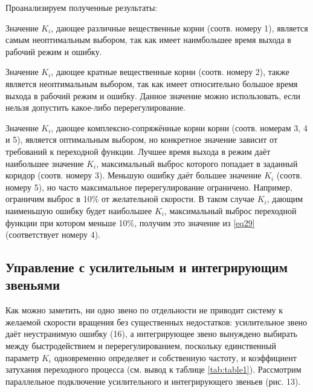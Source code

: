 \documentclass[12pt,a4paper]{extarticle}
\begin{document}
	Проанализируем полученные результаты:
	
	Значение $K_i$, дающее различные вещественные корни (соотв. номеру 1), является самым неоптимальным выбором, так как имеет наимбольшее время выхода в рабочий режим и ошибку.
	
	Значение $K_i$, дающее кратные вещественные корни (соотв. номеру 2), также является неоптимальным выбором, так как имеет относительно большое время выхода в рабочий режим и ошибку. Данное значение можно использовать, если нельзя допустить какое-либо перерегулирование.
	
	Значение $K_i$, дающее комплексно-сопряжённые корни корни (соотв. номерам 3, 4 и 5), является оптимальным выбором, но конкретное значение зависит от требований к переходной функции. Лучшее время выхода в режим даёт наибольшее значение $K_i$, максимальный выброс которого попадает в заданный коридор (соотв. номеру 3). Меньшую ошибку даёт большее значение $K_i$ (соотв. номеру 5), но часто максимальное перерегулирование ограничено. Например, ограничим выброс в 10\% от желательной скорости. В таком случае $K_i$, дающим наименьшую ошибку будет наибольшее $K_i$, максимальный выброс переходной функции при котором меньше 10\%, получим это значение из \ref{eq29} (соответствует номеру 4).
	
	
	\subsection{Управление с усилительным и интегрирующим звеньями}
	Как можно заметить, ни одно звено по отдельности не приводит систему к желаемой скорости вращения без существенных недостатков: усилительное звено даёт неустранимую ошибку (16), а интегрирующее звено вынуждено выбирать между быстродействием и перерегулированием, поскольку единственный параметр $K_i$ одновременно определяет и собственную частоту, и коэффициент затухания переходного процесса (см. вывод к таблице \ref{tab:table1}). Рассмотрим параллельное подключение усилительного и интегрирующего звеньев (рис. 13).
	
\end{document}
